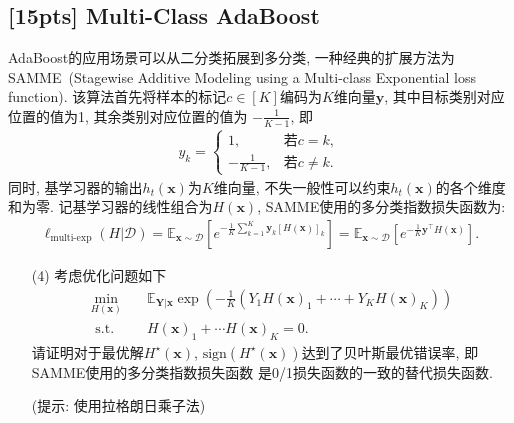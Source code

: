 \documentclass[a4paper,UTF8]{article}
\numberwithin{equation}{section}
\theoremstyle{definition}
\def \Y {\boldsymbol{Y}}
\def \y {\boldsymbol{y}}
\def \x {\boldsymbol{x}}
\begin{document}
\subsection{[15pts] Multi-Class AdaBoost}
AdaBoost的应用场景可以从二分类拓展到多分类, 一种经典的扩展方法为SAMME~(Stagewise Additive Modeling
using a Multi-class Exponential loss function). 该算法首先将样本的标记$c \in [K]$编码为$K$维向量$\y$, 其中目标类别对应位置的值为1, 其余类别对应位置的值为
$-\frac{1}{K-1}$, 即
\begin{align*}
    y_k = \begin{cases}
        1, & \text{若$c = k$}, \\
        -\frac{1}{K-1}, & \text{若$c \neq k$}.
    \end{cases}
\end{align*}
同时, 基学习器的输出$h_t(\x)$为$K$维向量, 不失一般性可以约束$h_t(\x)$的各个维度和为零. 记基学习器的线性组合为$H(\x)$, SAMME使用的多分类指数损失函数为:
\begin{align*}
    \ell_{\text{multi-exp}}(H|\mathcal{D}) = \mathbb{E}_{\x \sim \mathcal{D}}\left[e^{-\frac{1}{K} \sum_{k=1}^K \y_k[H(\x)]_k}\right]=\mathbb{E}_{\x \sim \mathcal{D}}\left[e^{-\frac{1}{K} \y^{\top} H(\x)}\right].
\end{align*}

\begin{enumerate}
    \item[(4)] 考虑优化问题如下
    \begin{align*}
        \min _{H(\x)} & \quad \mathbb{E}_{\Y|\x} \exp\left(-\frac{1}{K}(Y_1H(\x)_1 + \cdots + Y_K H(\x)_K)\right)\\
        \text { s.t. } & \quad H(\x)_1 + \cdots H(\x)_K = 0.
    \end{align*}
    请证明对于最优解$H^\star(\x)$, $\text{sign}(H^\star(\x))$达到了贝叶斯最优错误率, 即SAMME使用的多分类指数损失函数
    是0/1损失函数的一致的替代损失函数.

    (提示: 使用拉格朗日乘子法)
\end{enumerate}
\end{document}
